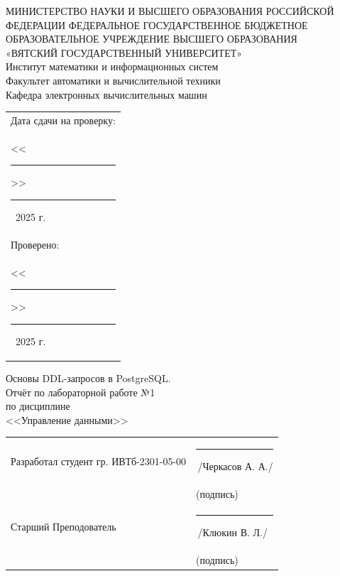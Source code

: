 \documentclass[oneside,a4paper,14pt]{extarticle}
\begin{document}
\newpage
\thispagestyle{empty}
\begin{center}
  МИНИСТЕРСТВО НАУКИ И ВЫСШЕГО ОБРАЗОВАНИЯ РОССИЙСКОЙ ФЕДЕРАЦИИ ФЕДЕРАЛЬНОЕ ГОСУДАРСТВЕННОЕ БЮДЖЕТНОЕ ОБРАЗОВАТЕЛЬНОЕ УЧРЕЖДЕНИЕ ВЫСШЕГО ОБРАЗОВАНИЯ\\
  «ВЯТСКИЙ ГОСУДАРСТВЕННЫЙ УНИВЕРСИТЕТ»\\
  Институт математики и информационных систем\\
  Факультет автоматики и вычислительной техники\\
  Кафедра электронных вычислительных машин
\end{center}
\vspace{10mm}

\hfill
\begin{tabular}{l}
  \footnotesize Дата сдачи на проверку:                                          \\
  \footnotesize <<\rule[-1mm]{5mm}{0.10mm}\/>>\rule[-1mm]{20mm}{0.10mm}\ 2025 г. \\
  \footnotesize Проверено:                                                       \\
  \footnotesize <<\rule[-1mm]{5mm}{0.10mm}\/>>\rule[-1mm]{20mm}{0.10mm}\ 2025 г. \\
\end{tabular}
\vfill

\begin{center}
  Основы DDL-запросов в PostgreSQL.\\
  Отчёт по лабораторной работе №1\\
  по дисциплине\\
  <<Управление данными>>\\
\end{center}
\vspace{25mm}
\noindent
\begin{tabular}{ll}
  Разработал студент гр. ИВТб-2301-05-00 & \hspace{18mm}\rule[-1mm]{30mm}{0.10mm}\,/Черкасов А. А./ \\
                                         & \hspace{25.5mm}\footnotesize(подпись)                    \\
  Старший Преподователь                  & \hspace{18mm}\rule[-1mm]{30mm}{0.10mm}\,/Клюкин В. Л./   \\
                                         & \hspace{25.5mm}\footnotesize(подпись)                    \\
\end{tabular}
\end{document}
